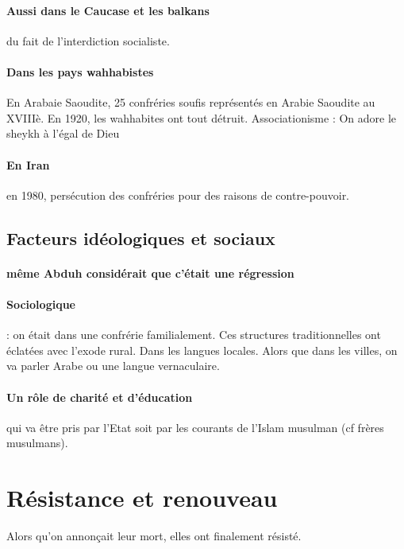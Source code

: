 \paragraph{Aussi dans le Caucase et les balkans} du fait de l'interdiction socialiste.

\paragraph{Dans les pays wahhabistes} En Arabaie Saoudite, 25 confréries soufis représentés en Arabie Saoudite au XVIIIè. En 1920, les wahhabites ont tout détruit. 
Associationisme : On adore le sheykh à l'égal de Dieu
 
 
 \paragraph{En Iran} en 1980, persécution des confréries pour des raisons de contre-pouvoir.
 
\subsection{Facteurs idéologiques et sociaux}

\paragraph{même Abduh considérait que c'était une régression}

\paragraph{Sociologique} : on était dans une confrérie familialement. Ces structures traditionnelles ont éclatées avec l'exode rural. Dans les langues locales. Alors que dans les villes, on va parler Arabe ou une langue vernaculaire.

\paragraph{Un rôle de charité et d'éducation} qui va être pris par l'Etat soit par les courants de l'Islam musulman (cf frères musulmans).


\section{Résistance et renouveau} 
Alors qu'on annonçait leur mort, elles ont finalement résisté.

